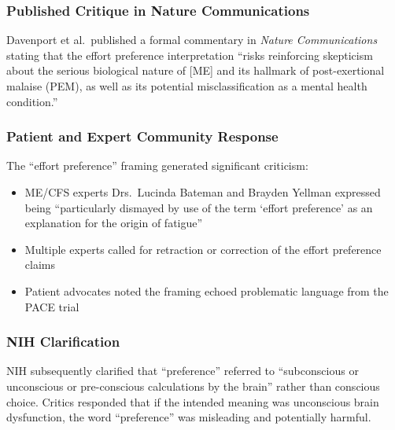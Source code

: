 \subsubsection{Published Critique in Nature Communications}
Davenport et al.\ published a formal commentary in \textit{Nature Communications}~\cite{effortcritique2025} stating that the effort preference interpretation ``risks reinforcing skepticism about the serious biological nature of [ME] and its hallmark of post-exertional malaise (PEM), as well as its potential misclassification as a mental health condition.''

\subsubsection{Patient and Expert Community Response}
The ``effort preference'' framing generated significant criticism:
\begin{itemize}
    \item ME/CFS experts Drs.\ Lucinda Bateman and Brayden Yellman expressed being ``particularly dismayed by use of the term `effort preference' as an explanation for the origin of fatigue''
    \item Multiple experts called for retraction or correction of the effort preference claims
    \item Patient advocates noted the framing echoed problematic language from the PACE trial
\end{itemize}

\subsubsection{NIH Clarification}
NIH subsequently clarified that ``preference'' referred to ``subconscious or unconscious or pre-conscious calculations by the brain'' rather than conscious choice. Critics responded that if the intended meaning was unconscious brain dysfunction, the word ``preference'' was misleading and potentially harmful.

